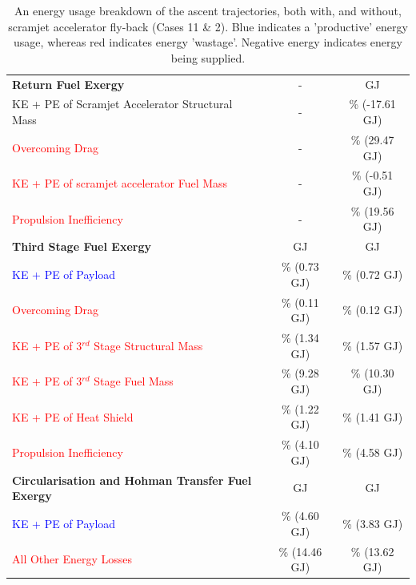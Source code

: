 \begin{table}[!ht]
\begin{tabular}{l c c}
		
		
		\textbf{Return Fuel Exergy} 
		& - & \textbf{\returnEnergyStandard} GJ
		\\
		KE + PE of Scramjet Accelerator Structural Mass
		& - & \WreturnStandard \% (-17.61 GJ)
		\\
		\textcolor{red}{Overcoming Drag}
		& - & \WDreturnStandard \% (29.47 GJ)
		\\
		\textcolor{red}{KE + PE of scramjet accelerator Fuel Mass}  
		& - & \WmFreturnStandard \% (-0.51 GJ)
		\\
		\textcolor{red}{Propulsion Inefficiency}  
		& - & \PlossreturnCombinedStandard \% (19.56 GJ)
		\\
		
		
		\textbf{Third Stage Fuel Exergy}  
		& \textbf{\thirdEnergyStandardNoReturn} GJ & \textbf{\thirdEnergyStandard} GJ
		\\
		\textcolor{blue}{KE + PE of Payload}  
		&\thirddExergyEffAtmStandardNoReturn \% (0.73 GJ) &\thirddExergyEffAtmStandard \% (0.72 GJ)
		\\
		\textcolor{red}{Overcoming Drag}  
		& \WDthreeStandardNoReturn \% (0.11 GJ) & \WDthreeStandard \% (0.12 GJ)
		\\
		\textcolor{red}{KE + PE  of 3$^{rd}$ Stage Structural Mass}  
		& \WthreeStandardNoReturn \% (1.34 GJ) & \WthreeStandard \% (1.57 GJ)
		\\
		
		\textcolor{red}{KE + PE  of 3$^{rd}$ Stage Fuel Mass}  
		& \WmFthreeStandardNoReturn \% (9.28 GJ) & \WmFthreeStandard \% (10.30 GJ)
		\\
		
		\textcolor{red}{KE + PE of Heat Shield}  
		
		& \WHSthreeStandardNoReturn \% (1.22 GJ) & \WHSthreeStandard \% (1.41 GJ)
		\\
		
		\textcolor{red}{Propulsion Inefficiency}  
		& \PlossthreeStandardNoReturn \% (4.10 GJ) & \PlossthreeStandard \% (4.58 GJ)
		\\
		\textbf{Circularisation and Hohman Transfer Fuel Exergy}  
		& \textbf{\HTExergyStandardNoReturn}  GJ & \textbf{\HTExergyStandard}  GJ
		\\
		\textcolor{blue}{KE + PE of Payload}  
		& \HTeffStandardNoReturn \% (4.60 GJ) & \HTeffStandard \% (3.83 GJ)
		\\
		\textcolor{red}{All Other Energy Losses}  
		& \HTlossStandardNoReturn \% (14.46 GJ) & \HTlossStandard \% (13.62 GJ)
		\\
		\hline 
	
	\end{tabular} 
	\caption{An energy usage breakdown of the ascent trajectories, both with, and without, scramjet accelerator fly-back (Cases 11 \& 2). Blue indicates a 'productive' energy usage, whereas red indicates energy 'wastage'. Negative energy indicates energy being supplied.}
	\label{tab:effStandard}
\end{table}



